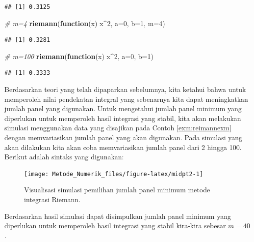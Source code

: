 \documentclass[]{book}
\newenvironment{Shaded}{\begin{snugshade}}{\end{snugshade}}
\newcommand{\CommentTok}[1]{\textcolor[rgb]{0.56,0.35,0.01}{\textit{#1}}}
\newcommand{\ControlFlowTok}[1]{\textcolor[rgb]{0.13,0.29,0.53}{\textbf{#1}}}
\newcommand{\DataTypeTok}[1]{\textcolor[rgb]{0.13,0.29,0.53}{#1}}
\newcommand{\DecValTok}[1]{\textcolor[rgb]{0.00,0.00,0.81}{#1}}
\newcommand{\KeywordTok}[1]{\textcolor[rgb]{0.13,0.29,0.53}{\textbf{#1}}}
\newcommand{\NormalTok}[1]{#1}
\newcommand{\OperatorTok}[1]{\textcolor[rgb]{0.81,0.36,0.00}{\textbf{#1}}}
\theoremstyle{definition}
\theoremstyle{definition}
\theoremstyle{definition}
\theoremstyle{remark}
\begin{document}
\begin{verbatim}
## [1] 0.3125
\end{verbatim}

\begin{Shaded}
\begin{Highlighting}[]
\CommentTok{# m=4}
\KeywordTok{riemann}\NormalTok{(}\ControlFlowTok{function}\NormalTok{(x) x}\OperatorTok{^}\DecValTok{2}\NormalTok{, }\DataTypeTok{a=}\DecValTok{0}\NormalTok{, }\DataTypeTok{b=}\DecValTok{1}\NormalTok{, }\DataTypeTok{m=}\DecValTok{4}\NormalTok{)}
\end{Highlighting}
\end{Shaded}

\begin{verbatim}
## [1] 0.3281
\end{verbatim}

\begin{Shaded}
\begin{Highlighting}[]
\CommentTok{# m=100}
\KeywordTok{riemann}\NormalTok{(}\ControlFlowTok{function}\NormalTok{(x) x}\OperatorTok{^}\DecValTok{2}\NormalTok{, }\DataTypeTok{a=}\DecValTok{0}\NormalTok{, }\DataTypeTok{b=}\DecValTok{1}\NormalTok{)}
\end{Highlighting}
\end{Shaded}

\begin{verbatim}
## [1] 0.3333
\end{verbatim}

Berdasarkan teori yang telah dipaparkan sebelumnya, kita ketahui bahwa untuk memperoleh nilai pendekatan integral yang sebenarnya kita dapat meningkatkan jumlah panel yang digunakan. Untuk mengetahui jumlah panel minimum yang diperlukan untuk memperoleh hasil integrasi yang stabil, kita akan melakukan simulasi menggunakan data yang disajikan pada Contoh \ref{exm:reimannexm} dengan memvariasikan jumlah panel yang akan digunakan. Pada simulasi yang akan dilakukan kita akan coba memvariasikan jumlah panel dari 2 hingga 100. Berikut adalah sintaks yang digunakan:

\begin{figure}

{\centering \texttt{[image: Metode\_Numerik\_files/figure-latex/midpt2-1]} 

}

\caption{Visualisasi simulasi pemilihan jumlah panel minimum metode integrasi Riemann.}\label{fig:midpt2}
\end{figure}

Berdasarkan hasil simulasi dapat disimpulkan jumlah panel minimum yang diperlukan untuk memperoleh hasil integrasi yang stabil kira-kira sebesar \(m=40\).
\end{document}
